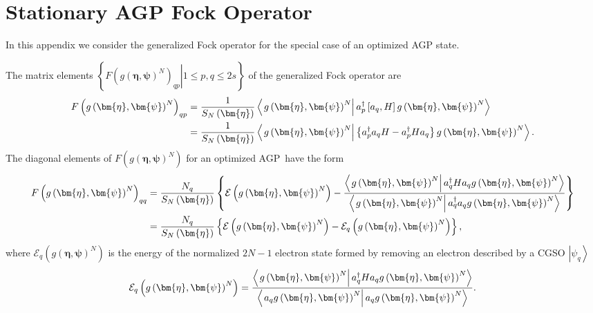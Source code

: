 \documentclass{preprint}
\begin{document}
\section{Stationary AGP Fock Operator\label{AGPFock}}

In this appendix we consider the generalized Fock operator for the special
case of an optimized AGP state.

The matrix elements $\left\{ \left. F\left( g\left( \bm{\eta
},\bm{\psi}\right) ^{N}\right) _{qp}\right\vert 1\leq p,q\leq2s\right\} $ of
the generalized Fock operator are
\begin{align}
F\left( g\left( \bm{\eta},\bm{\psi}\right) ^{N}\right) _{qp} & =\frac {1}{%
S_{N}\left( \bm{\eta}\right) }\left\langle \left. g\left( \bm{\eta},\bm{\psi}%
\right) ^{N}\right\vert a_{p}^{\dagger}\left[ a_{q},H\right] g\left( %
\bm{\eta},\bm{\psi}\right) ^{N}\right\rangle  \notag \\
& =\frac{1}{S_{N}\left( \bm{\eta}\right) }\left\langle \left. g\left( %
\bm{\eta},\bm{\psi}\right) ^{N}\right\vert \left\{
a_{p}^{\dagger}a_{q}H-a_{p}^{\dagger}Ha_{q}\right\} g\left( \bm{\eta},%
\bm{\psi }\right) ^{N}\right\rangle .
\end{align}
The diagonal elements of $F\left( g\left( \bm{\eta},\bm{\psi
}\right) ^{N}\right) $ for an optimized AGP\ have the form
\begin{align}
F\left( g\left( \bm{\eta},\bm{\psi}\right) ^{N}\right) _{qq} & =\frac{N_{q}}{%
S_{N}\left( \bm{\eta}\right) }\left\{ \mathcal{E}\left( g\left( \bm{\eta},%
\bm{\psi}\right) ^{N}\right) -\frac{\left\langle \left. g\left( \bm{\eta},%
\bm{\psi}\right) ^{N}\right\vert a_{q}^{\dagger}Ha_{q}g\left( \bm{\eta},%
\bm{\psi}\right) ^{N}\right\rangle }{\left\langle \left. g\left( \bm{\eta},%
\bm{\psi }\right) ^{N}\right\vert a_{q}^{\dagger }a_{q}g\left( \bm{\eta },%
\bm{\psi}\right) ^{N}\right\rangle }\right\}  \notag \\
& =\frac{N_{q}}{S_{N}\left( \bm{\eta}\right) }\left\{ \mathcal{E}\left(
g\left( \bm{\eta},\bm{\psi}\right) ^{N}\right) -\mathcal{E}_{q}\left(
g\left( \bm{\eta},\bm{\psi}\right) ^{N}\right) \right\} ,
\end{align}
where $\mathcal{E}_{q}\left( g\left( \bm{\eta},\bm{\psi}\right) ^{N}\right) $
is the energy of the normalized $2N-1$ electron state formed by removing an
electron described by a CGSO $\left\vert \psi_{q}\right\rangle $
\begin{equation}
\mathcal{E}_{q}\left( g\left( \bm{\eta},\bm{\psi}\right) ^{N}\right) =\frac{%
\left\langle \left. g\left( \bm{\eta},\bm{\psi }\right) ^{N}\right\vert
a_{q}^{\dagger}Ha_{q}g\left( \bm{\eta },\bm{\psi}\right) ^{N}\right\rangle }{%
\left\langle \left. a_{q}g\left( \bm{\eta},\bm{\psi}\right) ^{N}\right\vert
a_{q}g\left( \bm{\eta},\bm{\psi}\right) ^{N}\right\rangle }.
\end{equation}
\end{document}
